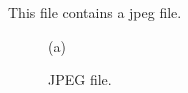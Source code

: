 \documentclass[12pt]{article}
\begin{document}
This file contains a jpeg file.
\begin{figure}[hbtp]
 \begin{center}
  (a)
  \end{center}
 \caption{JPEG file.}
\end{figure}
\end{document}
